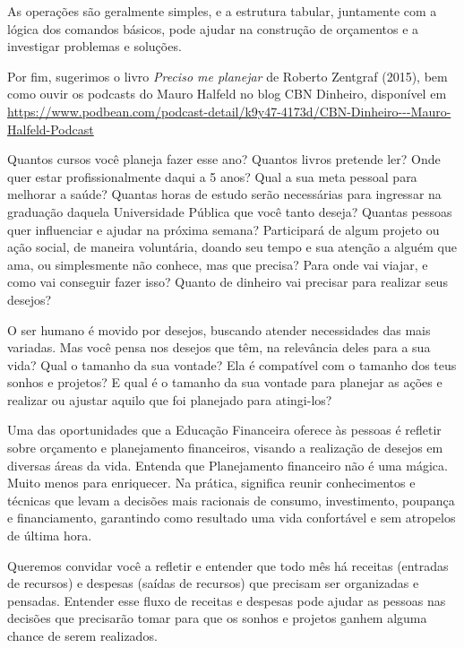 \begin{paginatexto}
As operações são geralmente simples, e a estrutura tabular, juntamente com a lógica dos comandos básicos, pode ajudar na construção de orçamentos e a investigar problemas e soluções.

Por fim, sugerimos o livro \textit{Preciso me planejar} de Roberto Zentgraf (2015), bem como ouvir os podcasts do Mauro Halfeld no blog CBN Dinheiro, disponível em \url{https://www.podbean.com/podcast-detail/k9y47-4173d/CBN-Dinheiro---Mauro-Halfeld-Podcast}

\end{paginatexto}


Quantos cursos você planeja fazer esse ano? Quantos livros pretende ler? Onde quer estar profissionalmente daqui a 5 anos? Qual a sua meta pessoal para melhorar a saúde? Quantas horas de estudo serão necessárias para ingressar na graduação daquela Universidade Pública que você tanto deseja? Quantas pessoas quer influenciar e ajudar na próxima semana? Participará de algum projeto ou ação social, de maneira voluntária, doando seu tempo e sua atenção a alguém que ama, ou simplesmente não conhece, mas que precisa? Para onde vai viajar, e como vai conseguir fazer isso? Quanto de dinheiro vai precisar para realizar seus desejos? 

O ser humano é movido por desejos, buscando atender necessidades das mais variadas. Mas você pensa nos desejos que têm, na relevância deles para a sua vida? Qual o tamanho da sua vontade? Ela é compatível com o tamanho dos teus sonhos e projetos? E qual é o tamanho da sua vontade para planejar as ações e realizar ou ajustar aquilo que foi planejado para atingi-los? 

Uma das oportunidades que a Educação Financeira oferece às pessoas é refletir sobre orçamento e planejamento financeiros, visando a realização de desejos em diversas áreas da vida. Entenda que Planejamento financeiro não é uma mágica. Muito menos para enriquecer. Na prática, significa reunir conhecimentos e técnicas que levam a decisões mais racionais de consumo, investimento, poupança e financiamento, garantindo como resultado uma vida confortável e sem atropelos de última hora.

Queremos convidar você a refletir e entender que todo mês há receitas (entradas de recursos) e despesas (saídas de recursos) que precisam ser organizadas e pensadas. Entender esse fluxo de receitas e despesas pode ajudar as pessoas nas decisões que precisarão tomar para que os sonhos e projetos ganhem alguma chance de serem realizados. 

